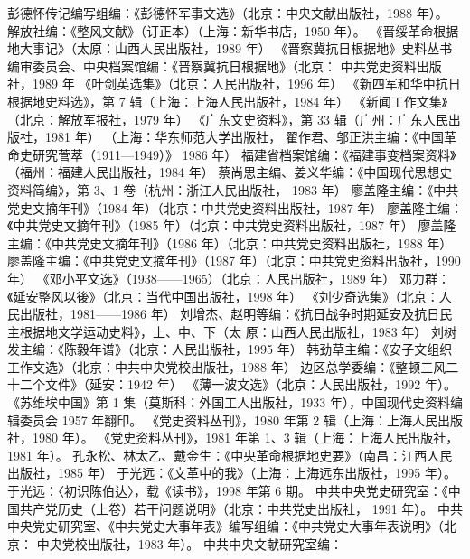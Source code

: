 \begin{thebibliography}{999}
\bibitem{} 彭德怀传记编写组编：《彭德怀军事文选》（北京：中央文献出版社，1988 年）。
\bibitem{} 解放社编：《整风文献》（订正本）（上海：新华书店，1950 年）。
\bibitem{} 《晋绥革命根据地大事记》（太原：山西人民出版社，1989 年）
\bibitem{} 《晋察冀抗日根据地》史料丛书编审委员会、中央档案馆编：《晋察冀抗日根据地》（北京：
中共党史资料出版社，1989 年
\bibitem{} 《叶剑英选集》（北京：人民出版社，1996 年）
\bibitem{} 《新四军和华中抗日根据地史料选》，第 7 辑（上海：上海人民出版社，1984 年）
\bibitem{} 《新闻工作文集》（北京：解放军报社，1979 年）
\bibitem{} 《广东文史资料》，第 33 辑（广州：广东人民出版社，1981 年）
（上海：华东师范大学出版社，
\bibitem{} 翟作君、邬正洪主编：《中国革命史研究菅萃（1911—1949）》
1986 年）
\bibitem{} 福建省档案馆编：《福建事变档案资料》（福州：福建人民出版社，1984 年）
\bibitem{} 蔡尚思主编、姜义华编：《中国现代思想史资料简编》，第 3、1 卷（杭州：浙江人民出版社，
1983 年）
\bibitem{} 廖盖隆主编：《中共党史文摘年刊》（1984 年）（北京：中共党史资料出版社，1987 年）
\bibitem{} 廖盖隆主编：《中共党史文摘年刊》（1985 年）（北京：中共党史资料出版社，1987 年）
\bibitem{} 廖盖隆主编：《中共党史文摘年刊》（1986 年）（北京：中共党史资料出版社，1988 年）
\bibitem{} 廖盖隆主编：《中共党史文摘年刊》（1987 年）（北京：中共党史资料出版社，1990 年）
\bibitem{} 《邓小平文选》（1938——1965）（北京：人民出版社，1989 年）
\bibitem{} 邓力群：《延安整风以後》（北京：当代中国出版社，1998 年）
\bibitem{} 《刘少奇选集》（北京：人民出版社，1981——1986 年）
\bibitem{} 刘增杰、赵明等编：《抗日战争时期延安及抗日民主根据地文学运动史料》，上、中、下（太
原：山西人民出版社，1983 年）
\bibitem{} 刘树发主编：《陈毅年谱》（北京：人民出版社，1995 年）
\bibitem{} 韩劲草主编：《安子文组织工作文选》（北京：中共中央党校出版社，1988 年）
\bibitem{} 边区总学委编：《整顿三风二十二个文件》（延安：1942 年）
\bibitem{} 《薄一波文选》（北京：人民出版社，1992 年）。
\bibitem{} 《苏维埃中国》第 1 集（莫斯科：外国工人出版社，1933 年），中国现代史资料编辑委员会
1957 年翻印。
\bibitem{} 《党史资料丛刊》，1980 年第 2 辑（上海：上海人民出版社，1980 年）。
\bibitem{} 《党史资料丛刊》，1981 年第 1、3 辑（上海：上海人民出版社，1981 年）。
\bibitem{} 孔永松、林太乙、戴金生：《中央革命根据地史要》（南昌：江西人民出版社，1985 年）
\bibitem{} 于光远：《文革中的我》（上海：上海远东出版社，1995 年）。
\bibitem{} 于光远：〈初识陈伯达〉，载《读书》，1998 年第 6 期。
\bibitem{} 中共中央党史研究室：《中国共产党历史（上卷）若干问题说明》（北京：中共党史出版社，
1991 年）。
\bibitem{} 中共中央党史研究室、《中共党史大事年表》编写组编：《中共党史大事年表说明》（北京：
中央党校出版社，1983 年）。
\bibitem{} 中共中央文献研究室编：

\end{thebibliography}

